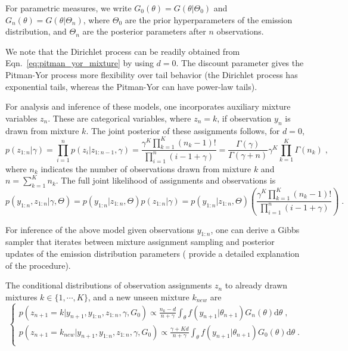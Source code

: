 \documentclass{article}
\begin{document}
For parametric measures, we write $G_0(\theta)=G(\theta|\Theta_0)$ and $G_n(\theta)=G(\theta|\Theta_n)$, where $\Theta_0$ are the prior hyperparameters of the emission distribution, and $\Theta_n$ are the posterior parameters after $n$ observations.

We note that the Dirichlet process can be readily obtained from Eqn.~\eqref{eq:pitman_yor_mixture} by using $d=0$. The discount parameter gives the Pitman-Yor process more flexibility over tail behavior (the Dirichlet process has exponential tails, whereas the Pitman-Yor can have power-law tails).

For analysis and inference of these models, one incorporates auxiliary mixture variables $z_n$. These are categorical variables, where $z_{n}=k$, if observation $y_n$ is drawn from mixture $k$. The joint posterior of these assignments follows, for $d=0$,
\begin{equation}
p(z_{1:n}|\gamma) = \prod_{i=1}^n p(z_i|z_{1:n-1},\gamma) = \frac{\gamma^K \prod_{k=1}^K(n_k-1)!}{\prod_{i=1}^n (i-1+\gamma)} = \frac{\Gamma(\gamma)}{\Gamma(\gamma+n)} \gamma^K \prod_{k=1}^K\Gamma(n_k) \; ,
\end{equation}
where $n_k$ indicates the number of observations drawn from mixture $k$ and $n=\sum_{k=1}^Kn_k$. The full joint likelihood of assignments and observations is 
\begin{equation}
p(y_{1:n},z_{1:n}|\gamma, \Theta) = p(y_{1:n}|z_{1:n}, \Theta) p(z_{1:n}|\gamma) = p(y_{1:n}|z_{1:n}, \Theta) \left( \frac{\gamma^K \prod_{k=1}^K(n_k-1)!}{\prod_{i=1}^n (i-1+\gamma)} \right) \; .
\end{equation}

For inference of the above model given observations $y_{1:n}$, one can derive a Gibbs sampler that iterates between mixture assignment sampling and posterior updates of the emission distribution parameters (\citet{j-Teh2010} provide a detailed explanation of the procedure).

The conditional distributions of observation assignments $z_n$ to already drawn mixtures $k\in\{1, \cdots, K\}$, and a new unseen mixture $k_{new}$ are
\begin{equation}
\begin{cases}
p(z_{n+1}=k|y_{n+1},y_{1:n},z_{1:n}, \gamma, G_0) \propto \frac{n_k-d}{n+\gamma} \int_{\theta} f(y_{n+1}|\theta_{n+1}) G_n(\theta) \mathrm{d}\theta \; ,\\
p(z_{n+1}=k_{new}|y_{n+1},y_{1:n},z_{1:n}, \gamma, G_0) \propto \frac{\gamma+K d}{n+\gamma} \int_{\theta} f(y_{n+1}|\theta_{n+1}) G_0(\theta) \mathrm{d} \theta \; .\\
\end{cases}
\label{eq:gibbs_mixture_assignment}
\end{equation}
\end{document}
